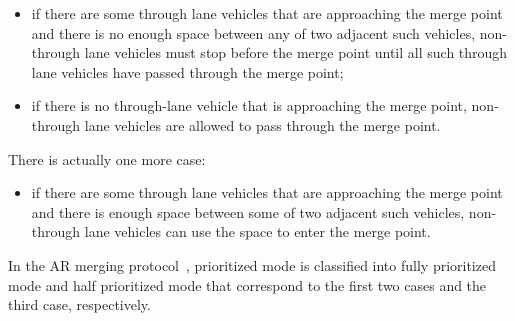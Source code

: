 \documentclass[10pt, conference, compsocconf]{IEEEtran}
\begin{document}
\begin{itemize}
\item if there are some through lane vehicles that are approaching the
  merge point and there is no enough space between any of two adjacent
  such vehicles, non-through lane vehicles must stop before the merge
  point until all such through lane vehicles have passed through the
  merge point;

\item if there is no through-lane vehicle that is approaching the
  merge point, non-through lane vehicles are allowed to pass through
  the merge point.
\end{itemize}

\noindent
There is actually one more case:

\begin{itemize}
\item if there are some through lane vehicles that are approaching the
  merge point and there is enough space between some of two adjacent
  such vehicles, non-through lane vehicles can use the space to enter
  the merge point.
\end{itemize}

\noindent
In the AR merging protocol~\cite{10.1145/3055004.3055028}, prioritized
mode is classified into fully prioritized mode and half prioritized
mode that correspond to the first two cases and the third case,
respectively. 



%
%
\end{document}
